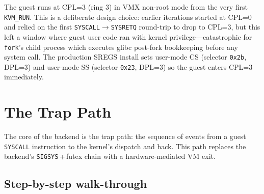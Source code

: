The guest runs at CPL=3 (ring 3) in VMX non-root mode from the very first
\texttt{KVM\_RUN}.  This is a deliberate design choice: earlier iterations
started at CPL=0 and relied on the first \texttt{SYSCALL}$\to$\texttt{SYSRETQ}
round-trip to drop to CPL=3, but this left a window where guest user code
ran with kernel privilege---catastrophic for \texttt{fork}'s child process
which executes glibc post-fork bookkeeping before any system call.  The
production SREGS install sets user-mode CS (selector \texttt{0x2b}, DPL=3) and
user-mode SS (selector \texttt{0x23}, DPL=3) so the guest enters CPL=3
immediately.


\section{The Trap Path}
\label{sec:kvm-trap-path}

The core of the \KVMvTwo{} backend is the trap path: the sequence of events
from a guest \texttt{SYSCALL} instruction to the \UML{} kernel's dispatch
and back.  This path replaces the \Seccomp{} backend's
\texttt{SIGSYS}\,+\,futex chain with a hardware-mediated VM exit.

\subsection{Step-by-step walk-through}

